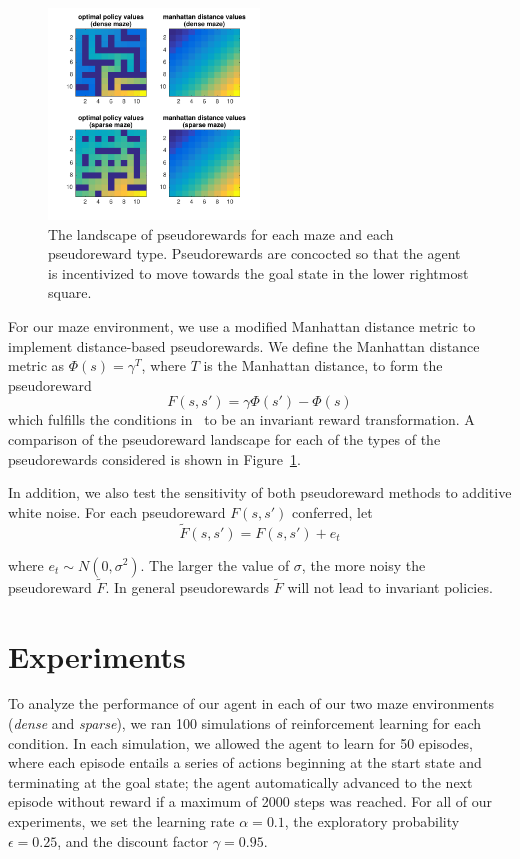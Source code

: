 \documentclass[notitlepage]{article}
\begin{document}
\begin{figure}[ht]
\centering
\includegraphics[width=0.5\textwidth]{value_landscapes}
\caption{The landscape of pseudorewards for each maze and each pseudoreward type. Pseudorewards are concocted so that the agent is incentivized to move towards the goal state in the lower rightmost square.}
\label{fig:value-landscapes}
\end{figure}

For our maze environment, we use a modified Manhattan distance metric to implement distance-based pseudorewards. We define the Manhattan distance metric as $\Phi(s) = \gamma^T$, where $T$ is the Manhattan distance, to form the pseudoreward
\begin{equation}
F(s, s') = \gamma \Phi(s') - \Phi(s)
\end{equation} 
which fulfills the conditions in~\cite{ng1999policy} to be an invariant reward transformation. A comparison of the pseudoreward landscape for each of the types of the pseudorewards considered is shown in Figure~\ref{fig:value-landscapes}.

In addition, we also test the sensitivity of both pseudoreward methods to additive white noise. For each pseudoreward $F(s, s')$ conferred, let
\begin{equation}
\tilde{F}(s, s') = F(s, s') + e_t
\end{equation} 

\noindent where $e_t \sim N(0, \sigma^2)$. The larger the value of $\sigma$, the more noisy the pseudoreward $\tilde{F}$. In general pseudorewards $\tilde{F}$ will not lead to invariant policies.

\section*{Experiments}

To analyze the performance of our agent in each of our two maze environments (\textit{dense} and \textit{sparse}), we ran 100 simulations of reinforcement learning for each condition. In each simulation, we allowed the agent to learn for 50 episodes, where each episode entails a series of actions beginning at the start state and terminating at the goal state; the agent automatically advanced to the next episode without reward if a maximum of 2000 steps was reached. For all of our experiments, we set the learning rate $\alpha = 0.1$, the exploratory probability $\epsilon = 0.25$, and the discount factor $\gamma = 0.95$. 
\end{document}
